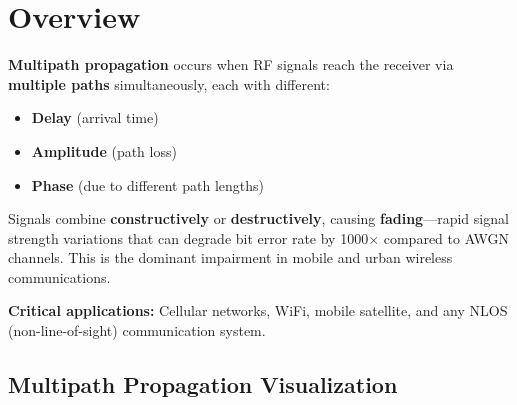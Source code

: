 \section{Overview}

\textbf{Multipath propagation} occurs when RF signals reach the receiver via \textbf{multiple paths} simultaneously, each with different:
\begin{itemize}
\item \textbf{Delay} (arrival time)
\item \textbf{Amplitude} (path loss)
\item \textbf{Phase} (due to different path lengths)
\end{itemize}

\begin{keyconcept}
Signals combine \textbf{constructively} or \textbf{destructively}, causing \textbf{fading}---rapid signal strength variations that can degrade bit error rate by 1000$\times$ compared to AWGN channels. This is the dominant impairment in mobile and urban wireless communications.
\end{keyconcept}

\textbf{Critical applications:} Cellular networks, WiFi, mobile satellite, and any NLOS (non-line-of-sight) communication system.

\subsection{Multipath Propagation Visualization}

